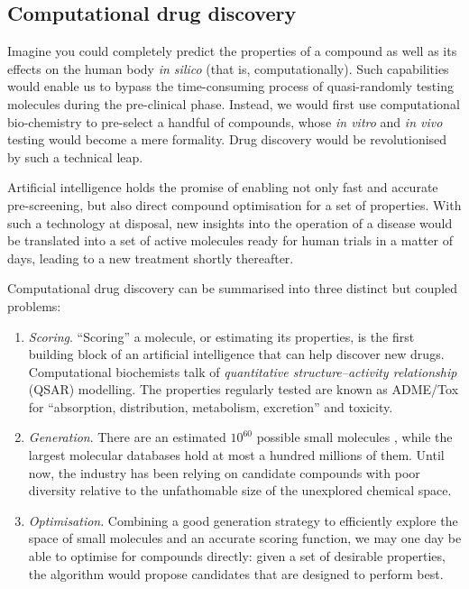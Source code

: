 \documentclass[11pt]{article}
\numberwithin{equation}{subsection}
\begin{document}




\subsection{Computational drug discovery}
\label{sec:computational}

Imagine you could completely predict the properties of a compound as well as its effects on the human body \textit{in silico} (that is, computationally). Such capabilities would enable us to bypass the time-consuming process of quasi-randomly testing molecules during the pre-clinical phase. Instead, we would first use computational bio-chemistry to pre-select a handful of compounds, whose \textit{in vitro} and \textit{in vivo} testing would become a mere formality. Drug discovery would be revolutionised by such a technical leap.

Artificial intelligence holds the promise of enabling not only fast and accurate pre-screening, but also direct compound optimisation for a set of properties. With such a technology at disposal, new insights into the operation of a disease would be translated into a set of active molecules ready for human trials in a matter of days, leading to a new treatment shortly thereafter.

Computational drug discovery can be summarised into three distinct but coupled problems:
\begin{enumerate}
  \item \textit{Scoring}. ``Scoring'' a molecule, or estimating its properties, is the first building block of an artificial intelligence that can help discover new drugs. Computational biochemists talk of \textit{quantitative structure–activity relationship} (QSAR) modelling. The properties regularly tested are known as ADME/Tox for ``absorption, distribution, metabolism, excretion'' and toxicity.

  \item \textit{Generation}. There are an estimated $10^{60}$ possible small molecules \citep{chemicalspace}, while the largest molecular databases hold at most a hundred millions of them. Until now, the industry has been relying on candidate compounds with poor diversity relative to the unfathomable size of the unexplored chemical space.

  \item \textit{Optimisation}. Combining a good generation strategy to efficiently explore the space of small molecules and an accurate scoring function, we may one day be able to optimise for compounds directly: given a set of desirable properties, the algorithm would propose candidates that are designed to perform best.
\end{enumerate}
\end{document}
